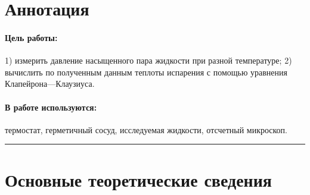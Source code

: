 \documentclass[a4paper,12pt]{report}
\begin{document}
	
	\newpage
    \pagestyle{fancy}

    \fancyhead{}
    \fancyfoot{}
    \fancyhead[L]{\rightmark}
    \fancyhead[R]{\thepage}

    \section*{Аннотация}
        \paragraph*{Цель работы:} 1) измерить давление насыщенного пара жидкости при разной температуре; 2) вычислить по полученным данным теплоты испарения с помощью уравнения Клапейрона---Клаузиуса.
        \paragraph*{В работе используются:} термостат, герметичный сосуд, исследуемая жидкости, отсчетный микроскоп. 
    \vspace{0.5cm}
    \hrule

    \section{Основные теоретические сведения}
\end{document}
